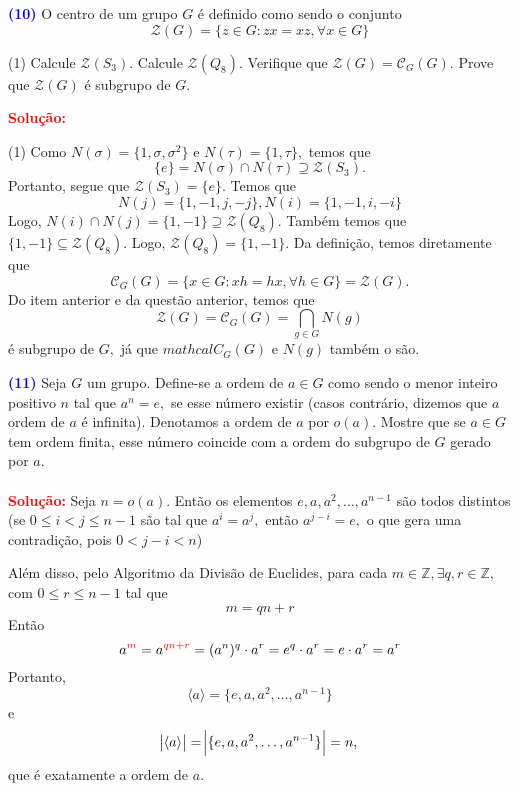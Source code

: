 \documentclass[12pt, a4paper]{article}
\newcommand{\negrito}[1]{\mbox{\boldmath{$#1$}}}
\begin{document}
\textcolor{blue}{\bf(10)}\label{18} O centro de um grupo $G$ é definido como sendo o conjunto
\[
\mathcal{Z}(G) = \{ z \in G : zx = xz, \forall x \in G \}
\]
\begin{tasks}[counter-format={(tsk[a])},label-width=3.6ex, label-format = {\bfseries}, column-sep = {0pt}](1)
\task[\textcolor{Floresta}{$\negrito{(a)} $}] Calcule $\mathcal{Z}(S_3).$
\task[\textcolor{Floresta}{$\negrito{(b)} $}] Calcule $\mathcal{Z}(Q_8).$
\task[\textcolor{Floresta}{$\negrito{(c)} $}] Verifique que $\mathcal{Z}(G) = \mathcal{C}_G(G).$
\task[\textcolor{Floresta}{$\negrito{(d)} $}] Prove que $\mathcal{Z}(G)$ é subgrupo de $G.$
\end{tasks}
\textbf{\textcolor{red}{Solução:}}
\begin{tasks}[counter-format={(tsk[a])},label-width=3.6ex, label-format = {\bfseries}, column-sep = {0pt}](1)
\task[\textcolor{Floresta}{$\negrito{(a)} $}] Como $N(\sigma) = \{1, \sigma, \sigma^2 \}$ e $N(\tau) = \{1, \tau\},$ temos que
\[
\{ e \} = N(\sigma) \cap N(\tau) \supseteq \mathcal{Z}(S_3).
\]
Portanto, segue que $\mathcal{Z}(S_3) = \{e\}.$
\task[\textcolor{Floresta}{$\negrito{(b)} $}] Temos que
\[
N(j) = \{1,-1,j,-j\}, N(i) = \{1,-1,i,-i\}
\]
Logo, $N(i) \cap N(j) = \{1,-1\} \supseteq \mathcal{Z}(Q_8).$
Também temos que $ \{1,-1\} \subseteq \mathcal{Z}(Q_8).$ Logo, $\mathcal{Z}(Q_8) = \{1, -1 \}.$
\task[\textcolor{Floresta}{$\negrito{(c)} $}] Da definição, temos diretamente que
\[
\mathcal{C}_G(G) = \{x \in G : xh = hx, \forall h \in G \} = \mathcal{Z}(G).
\]
\task[\textcolor{Floresta}{$\negrito{(d)} $}] Do item anterior e da questão anterior, temos que 
\[
\mathcal{Z}(G) = \mathcal{C}_G(G) = \bigcap\limits_{g \in G} N(g)
\]
é subgrupo de $G,$ já que $mathcal{C}_G(G)$ e $N(g)$ também o são.
\end{tasks}
\textcolor{blue}{\bf(11)}\label{19} Seja $G$ um grupo. Define-se a ordem de $a \in G$ como sendo o menor inteiro positivo $n$ tal que $a^n = e,$ se esse número existir (casos contrário, dizemos que $a$ ordem de $a$ é infinita). Denotamos a ordem de $a$ por $o(a).$ Mostre que se $a \in G$ tem ordem finita, esse número coincide com a ordem do subgrupo de $G$ gerado por $a.$\\ \\ 
\textbf{\textcolor{red}{Solução:}} Seja $n = o(a).$ Então os elementos $e, a, a^2, \ldots, a^{n-1}$ são todos distintos (se $0 \le i < j \le n-1$ são tal que $a^i = a^j,$ então $a^{j-i} = e,$ o que gera uma contradição, pois $0 < j-i < n$)

Além disso, pelo Algoritmo da Divisão de Euclides, para cada $m \in \mathbb{Z}, \exists q,r \in \mathbb{Z},$ com $0 \le r \le n-1$ tal que
\[
m = qn + r
\]
Então
\[
a^{\textcolor{red}{m}} =a^{\textcolor{red}{qn + r}} = (a^n)^q \cdot a^r = e^q \cdot a^r = e \cdot a^r = a^r
\]
Portanto,
\[
\langle a \rangle = \{e,a,a^2, \ldots, a^{n-1}\}
\]
e
\[
\abs{\langle a \rangle} = \abs{\{e,a,a^2, \ldots, a^{n-1}\}} = n,
\]
que é exatamente a ordem de $a.$
\end{document}
